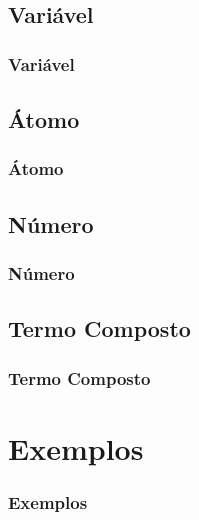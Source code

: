 \documentclass[sans]{beamer}
\begin{document}

\subsection{Variável}
\begin{frame}[fragile]   %
\frametitle{Variável}

\end{frame}


\subsection{Átomo}
\begin{frame}[fragile]   %
\frametitle{Átomo}

\end{frame}


\subsection{Número}
\begin{frame}[fragile]   %
\frametitle{Número}

\end{frame}


\subsection{Termo Composto}
\begin{frame}[fragile]   %
\frametitle{Termo Composto}

\end{frame}


\section{Exemplos}
\begin{frame}[fragile]   %
\frametitle{Exemplos}

\end{frame}
\end{document}
